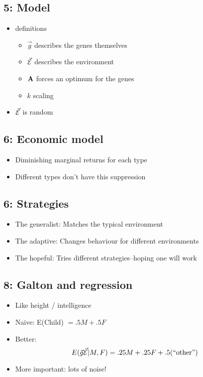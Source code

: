 \documentclass[12pt,twocolumn]{article}
\begin{document}
\subsection*{5: Model}
\begin{itemize}
\item definitions
   \begin{itemize}
     \item $\vec{g}$ describes the genes themselves
     \item $\vec{\cal E}$ describes the environment
     \item ${\bf A}$ forces an optimum for the genes
     \item $k$ scaling 
   \end{itemize}
\item $\vec{\cal E}$ is random 
\end{itemize}

\subsection*{6: Economic model}
\begin{itemize}
\item Diminishing marginal returns for each type
\item Different types don't have this suppression
\end{itemize}

\subsection*{6: Strategies}
\begin{itemize}
\item The generalist: Matches the typical environment
\item The adaptive: Changes behaviour for different environments
\item The hopeful: Tries different strategies--hoping one will work
\end{itemize}

\subsection*{8: Galton and regression}
\begin{itemize}
\item Like height / intelligence
\item Naive: E(Child) $= .5 M+ .5 F $
\item Better: 
\begin{displaymath}
E(\vec{g}\vec{\cal E}|M,F) = .25 M + .25 F + .5(\hbox{``other''})
\end{displaymath}
\item More important: lots of noise!
\end{itemize}
\newpage
\end{document}
